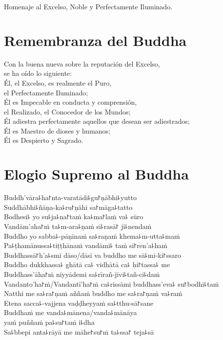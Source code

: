 Homenaje al Excelso, Noble y Perfectamente Iluminado.


\nextChapterUseDelegatedPageNumber

\chapter{Remembranza del Buddha}

\begin{leader}
\end{leader}

Con la buena nueva sobre la reputación del Excelso,\\
\vin se ha oído lo siguiente:\\
Él, el Excelso, es realmente el Puro,\\
\vin el Perfectamente Iluminado;\\
Él es Impecable en conducta y comprensión,\\
\vin el Realizado, el Conocedor de los Mundos;\\
Él adiestra perfectamente aquellos que desean ser adiestrados;\\
Él es Maestro de dioses y humanos;\\
Él es Despierto y Sagrado.

\clearpage

\chapter*{Elogio Supremo al Buddha}

\delegateSetUseNext

\begin{leader}
\end{leader}

Buddh'vāra꜕ha꜓nta-varatādi꜕gu꜓ṇābhi꜕yutto\\
Suddhābhi꜕ñāṇa-ka꜕ru꜓ṇāhi sa꜓māga꜕tatto\\
Bodhesi꜕ yo su꜕ja꜕na꜓taṁ ka꜕ma꜓laṁ va꜕ sūro\\
Vandām'aha꜓ṁ ta꜕m-ara꜕ṇaṁ si꜕rasā꜓ ji꜕nendaṁ\\
Buddho yo sabba꜕-pāṇīnaṁ sa꜕raṇaṁ khema꜕m-utta꜕maṁ\\
Pa꜕ṭhamānussa꜕tiṭṭhānaṁ vandāmi꜕ taṁ si꜓ren'a꜕haṁ\\
Buddhassā꜓h'a꜕smi dāso/dāsī va buddho me sā꜕mi-ki꜓ssaro\\
Buddho dukkhassa꜕ ghātā ca꜕ vidhātā ca꜕ hi꜓tassa꜕ me\\
Buddhass'āha꜓ṁ niyyādemi sa꜕rīrañ-jīvi꜕tañ-ci꜕daṁ\\
Vandanto'ha꜓ṁ/Vandantī'ha꜓ṁ ca꜕rissāmi buddhass'eva꜕ su꜓bodhi꜕taṁ\\
Natthi me sa꜕ra꜓ṇaṁ aññaṁ buddho me sa꜕ra꜓ṇaṁ va꜕raṁ\\
Etena sacca꜕-vajjena vaḍḍheyyaṁ sa꜕tthu-sā꜓sane\\
Buddhaṁ me vanda꜕mānena/vanda꜕mānāya\\
\vin yaṁ puññaṁ pa꜕su꜓taṁ i꜕dha\\
Sa꜕bbepi anta꜕rāyā me māhe꜓su꜓ṁ ta꜕ssa꜓ teja꜕sā

